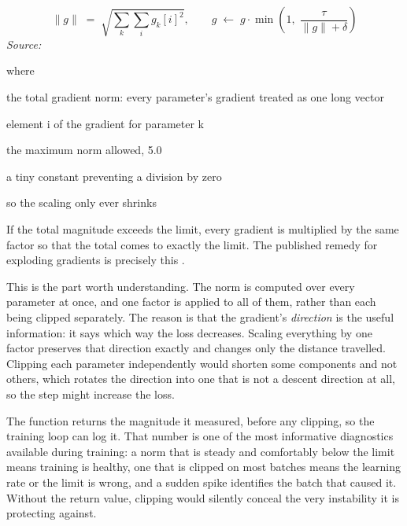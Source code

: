 
\begin{equation}
\|g\| \;=\; \sqrt{\sum_{k} \sum_{i} g_k[i]^2}, \qquad g \;\leftarrow\; g \cdot \min\!\left(1,\; \frac{\tau}{\|g\| + \delta}\right)
\end{equation}
\noindent\emph{Source: }\cite{pascanu2013}


\noindent where
\begin{description}[leftmargin=2.4em,style=nextline,font=\normalfont\ttfamily]\setlength\itemsep{1pt}
  \item[{$\|g\|$}] \normalfont the total gradient norm: every parameter's gradient treated as one long vector
  \item[{$g_k[i]$}] \normalfont element i of the gradient for parameter k
  \item[{$\tau$}] \normalfont the maximum norm allowed, 5.0
  \item[{$\delta$}] \normalfont a tiny constant preventing a division by zero
  \item[{$\min(1,\cdot)$}] \normalfont so the scaling only ever shrinks
\end{description}
If the total magnitude exceeds the limit, every gradient is multiplied by the same factor so that the total comes to exactly the limit. The published remedy for exploding gradients is precisely this \cite{pascanu2013}.


This is the part worth understanding. The norm is computed over every parameter at once, and one factor is applied to all of them, rather than each being clipped separately. The reason is that the gradient's \emph{direction} is the useful information: it says which way the loss decreases. Scaling everything by one factor preserves that direction exactly and changes only the distance travelled. Clipping each parameter independently would shorten some components and not others, which rotates the direction into one that is not a descent direction at all, so the step might increase the loss.


The function returns the magnitude it measured, before any clipping, so the training loop can log it. That number is one of the most informative diagnostics available during training: a norm that is steady and comfortably below the limit means training is healthy, one that is clipped on most batches means the learning rate or the limit is wrong, and a sudden spike identifies the batch that caused it. Without the return value, clipping would silently conceal the very instability it is protecting against.



